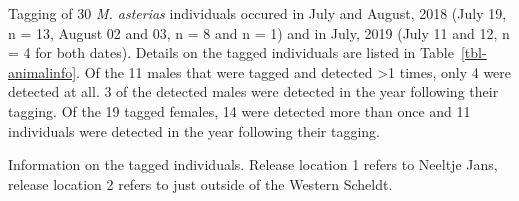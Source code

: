 \documentclass[
  authoryear,
  review,
  3p]{elsarticle}
\begin{document}
Tagging of 30 \emph{M. asterias} individuals occured in July and August,
2018 (July 19, n = 13, August 02 and 03, n = 8 and n = 1) and in July,
2019 (July 11 and 12, n = 4 for both dates). Details on the tagged
individuals are listed in Table~\ref{tbl-animalinfo}. Of the 11 males
that were tagged and detected \textgreater1 times, only 4 were detected
at all. 3 of the detected males were detected in the year following
their tagging. Of the 19 tagged females, 14 were detected more than once
and 11 individuals were detected in the year following their tagging.

\hypertarget{tbl-animalinfo}{}
\begin{table}[H]
\caption{\label{tbl-animalinfo}Information on the tagged individuals. Release location 1 refers to
Neeltje Jans, release location 2 refers to just outside of the Western
Scheldt. }\tabularnewline


\end{table}
\end{document}
